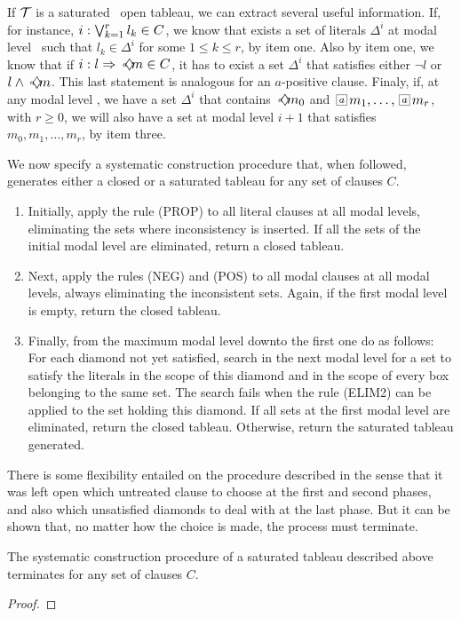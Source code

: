 If $\cal{T}$ is a saturated \ckn~open tableau, we can extract several useful
information. If, for instance, $\cprop{r}{k}
\in C$, we know that exists a set of literals $\Delta^i$ at modal level \ml~such
that $l_k \in \Delta^i$ for some $1 \leq k \leq r$, by item one. Also by item one,
we know that if $\cneg \in C$, it has to exist a set $\Delta^i$ that satisfies
either $\neg l$ or $l \land \pos{a} m$. This last statement is analogous for an
$a$-positive clause. Finaly, if, at any modal level \ml, we have a set
$\Delta^i$ that contains $\pos{a} m_0$ and $\nec{a} m_1, \ldots, \nec{a} m_r$,
with $r \geq 0$, we will also have a set at modal level $i+1$ that satisfies
$m_0, m_1, \ldots, m_r$, by item three. 

We now specify a systematic construction procedure that, when followed,
generates either a closed or a saturated tableau for any set of clauses
$C$.

\begin{enumerate}
    \item Initially, apply the rule (PROP) to all literal clauses at all modal
        levels, eliminating the sets where inconsistency is inserted. If all the
        sets of the initial modal level are eliminated, return a closed tableau.
    \item Next, apply the rules (NEG) and (POS) to all modal clauses at all modal
        levels, always eliminating the inconsistent sets. Again, if the first
        modal level is empty, return the closed tableau.
    \item Finally, from the maximum modal level downto the first one do as
        follows: For each diamond not yet satisfied, search in the next modal
        level for a set to satisfy the literals in the scope of this diamond and
        in the scope of every box belonging to the same set. The search fails
        when the rule (ELIM2) can be applied to the set holding this diamond.
        If all sets at the first modal level are eliminated, return the closed
        tableau. Otherwise, return the saturated tableau generated.
\end{enumerate}

There is some flexibility entailed on the procedure described in the sense that
it was left open which untreated clause to choose at the first and second
phases, and also which unsatisfied diamonds to deal with at the last phase. But
it can be shown that, no matter how the choice is made, the process must
terminate.

\begin{lemma}
    The systematic construction procedure of a saturated tableau described above
    terminates for any set of clauses $C$.
\end{lemma}
\begin{proof}
\end{proof}

